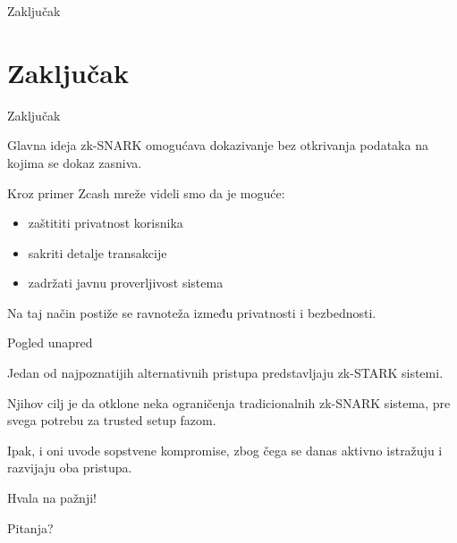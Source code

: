 \documentclass[aspectratio=1610]{beamer}
\begin{document}
\begin{frame}
\centering
\vfill

{\Huge Zaključak}

\vfill
\end{frame}

\section{Zaključak}

\begin{frame}{Zaključak}

\begin{block}{Glavna ideja}
zk-SNARK omogućava dokazivanje bez otkrivanja podataka na kojima se dokaz zasniva.
\end{block}

\bigskip

Kroz primer Zcash mreže videli smo da je moguće:

\begin{itemize}
    \item zaštititi privatnost korisnika
    \item sakriti detalje transakcije
    \item zadržati javnu proverljivost sistema
\end{itemize}

\bigskip

Na taj način postiže se ravnoteža između privatnosti i bezbednosti.

\end{frame}

\begin{frame}{Pogled unapred}

Jedan od najpoznatijih alternativnih pristupa predstavljaju zk-STARK sistemi.

\bigskip

Njihov cilj je da otklone neka ograničenja tradicionalnih zk-SNARK sistema, pre svega potrebu za trusted setup fazom.

\bigskip

Ipak, i oni uvode sopstvene kompromise, zbog čega se danas aktivno istražuju i razvijaju oba pristupa.

\end{frame}

\begin{frame}
\centering

\vfill

{\Huge Hvala na pažnji!}

\vspace{1cm}

{\Large Pitanja?}

\vfill

\end{frame}
\end{document}
